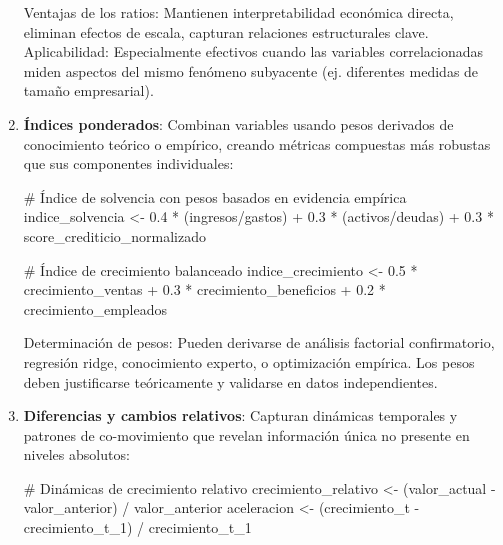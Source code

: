 \documentclass[
  letterpaper,
  DIV=11,
  numbers=noendperiod]{scrreprt}
\newenvironment{Shaded}{\begin{snugshade}}{\end{snugshade}}
\newcommand{\CommentTok}[1]{\textcolor[rgb]{0.37,0.37,0.37}{#1}}
\newcommand{\FloatTok}[1]{\textcolor[rgb]{0.68,0.00,0.00}{#1}}
\newcommand{\NormalTok}[1]{\textcolor[rgb]{0.00,0.23,0.31}{#1}}
\newcommand{\OtherTok}[1]{\textcolor[rgb]{0.00,0.23,0.31}{#1}}
\newcommand{\SpecialCharTok}[1]{\textcolor[rgb]{0.37,0.37,0.37}{#1}}
\begin{document}
\begin{enumerate}
  Ventajas de los ratios: Mantienen interpretabilidad económica directa,
  eliminan efectos de escala, capturan relaciones estructurales clave.
  Aplicabilidad: Especialmente efectivos cuando las variables
  correlacionadas miden aspectos del mismo fenómeno subyacente (ej.
  diferentes medidas de tamaño empresarial).
\item
  \textbf{Índices ponderados}: Combinan variables usando pesos derivados
  de conocimiento teórico o empírico, creando métricas compuestas más
  robustas que sus componentes individuales:

\begin{Shaded}
\begin{Highlighting}[]
\CommentTok{\# Índice de solvencia con pesos basados en evidencia empírica}
\NormalTok{indice\_solvencia }\OtherTok{\textless{}{-}} \FloatTok{0.4} \SpecialCharTok{*}\NormalTok{ (ingresos}\SpecialCharTok{/}\NormalTok{gastos) }\SpecialCharTok{+} \FloatTok{0.3} \SpecialCharTok{*}\NormalTok{ (activos}\SpecialCharTok{/}\NormalTok{deudas) }\SpecialCharTok{+} \FloatTok{0.3} \SpecialCharTok{*}\NormalTok{ score\_crediticio\_normalizado}

\CommentTok{\# Índice de crecimiento balanceado}
\NormalTok{indice\_crecimiento }\OtherTok{\textless{}{-}} \FloatTok{0.5} \SpecialCharTok{*}\NormalTok{ crecimiento\_ventas }\SpecialCharTok{+} \FloatTok{0.3} \SpecialCharTok{*}\NormalTok{ crecimiento\_beneficios }\SpecialCharTok{+} \FloatTok{0.2} \SpecialCharTok{*}\NormalTok{ crecimiento\_empleados}
\end{Highlighting}
\end{Shaded}

  Determinación de pesos: Pueden derivarse de análisis factorial
  confirmatorio, regresión ridge, conocimiento experto, o optimización
  empírica. Los pesos deben justificarse teóricamente y validarse en
  datos independientes.
\item
  \textbf{Diferencias y cambios relativos}: Capturan dinámicas
  temporales y patrones de co-movimiento que revelan información única
  no presente en niveles absolutos:

\begin{Shaded}
\begin{Highlighting}[]
\CommentTok{\# Dinámicas de crecimiento relativo}
\NormalTok{crecimiento\_relativo }\OtherTok{\textless{}{-}}\NormalTok{ (valor\_actual }\SpecialCharTok{{-}}\NormalTok{ valor\_anterior) }\SpecialCharTok{/}\NormalTok{ valor\_anterior}
\NormalTok{aceleracion }\OtherTok{\textless{}{-}}\NormalTok{ (crecimiento\_t }\SpecialCharTok{{-}}\NormalTok{ crecimiento\_t\_1) }\SpecialCharTok{/}\NormalTok{ crecimiento\_t\_1}


\end{Highlighting}
\end{Shaded}
\end{enumerate}
\end{document}
